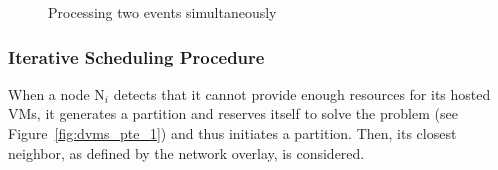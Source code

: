\begin{figure}[tb]
%
%
%
%
\caption{Processing two events simultaneously\label{fig:dvms_pte}}
\vspace*{-.3cm}
\end{figure}


\subsubsection{Iterative Scheduling Procedure}
\label{sec:ISP}

When a node N\(_{\textit{i}}\)
detects that it cannot provide enough resources for its hosted VMs, it
generates a partition and reserves itself to solve the problem (see
Figure~\ref{fig:dvms_pte_1}) and thus initiates a partition. Then, its
closest neighbor, as defined by the network overlay, is considered.

